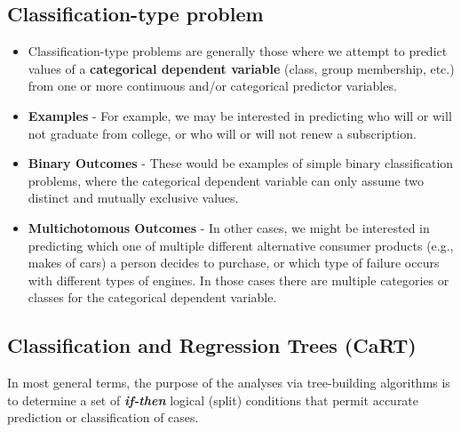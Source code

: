 \documentclass[caret-main.tex]{subfiles}
\begin{document}
\subsection{Classification-type problem}
\begin{itemize}
\item Classification-type problems are generally those where we attempt to predict values of a \textbf{categorical dependent variable} (class, group membership, etc.) from one or more continuous and/or categorical predictor variables. 
\item \textbf{Examples} - For example, we may be interested in predicting who will or will not graduate from college, or who will or will not renew a subscription. 
\item \textbf{Binary Outcomes} - These would be examples of simple binary classification problems, where the categorical dependent variable can only assume two distinct and mutually exclusive values. 
\item \textbf{Multichotomous Outcomes} - In other cases, we might be interested in predicting which one of multiple different alternative consumer products (e.g., makes of cars) a person decides to purchase, or which type of failure occurs with different types of engines. 
In those cases there are multiple categories or classes for the categorical dependent variable. 
\end{itemize}

\newpage
\subsection{Classification and Regression Trees (CaRT)}

In most general terms, the purpose of the analyses via tree-building algorithms is to determine a set of \textbf{\textit{if-then}} logical (split) conditions that permit accurate prediction or classification of cases.
\end{document}
